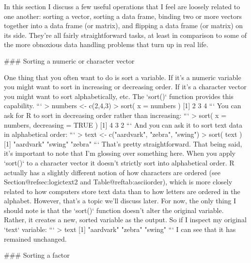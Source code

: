 In this section I discuss a few useful operations that I feel are loosely related to one another: sorting a vector, sorting a data frame, binding two or more vectors together into a data frame (or matrix), and flipping a data frame (or matrix) on its side. They're all fairly straightforward tasks, at least in comparison to some of the more obnoxious data handling problems that turn up in real life.

### Sorting a numeric or character vector

One thing that you often want to do is sort a variable. If it's a numeric variable you might want to sort in increasing or decreasing order. If it's a character vector you might want to sort alphabetically, etc. The `sort()` function provides this capability. 
```
> numbers <- c(2,4,3)
> sort( x = numbers )
[1] 2 3 4
```
You can ask for R to sort in decreasing order rather than increasing:
```
> sort( x = numbers, decreasing = TRUE )
[1] 4 3 2
```
And you can ask it to sort text data in alphabetical order:
```
> text <- c("aardvark", "zebra", "swing")
> sort( text )
[1] "aardvark" "swing"    "zebra"  
```
That's pretty straightforward. That being said, it's important to note that I'm glossing over something here. When you apply `sort()` to a character vector it doesn't strictly sort into alphabetical order. R actually has a slightly different notion of how characters are ordered (see Section@refsec:logictext2 and Table@reftab:asciiorder), which is more closely related to how computers store text data than to how letters are ordered in the alphabet. However, that's a topic we'll discuss later. For now, the only thing I should note is that the `sort()` function doesn't alter the original variable. Rather, it creates a new, sorted variable as the output. So if I inspect my original `text` variable:
```
> text
[1] "aardvark" "zebra"    "swing"   
```
I can see that it has remained unchanged.

### Sorting a factor

